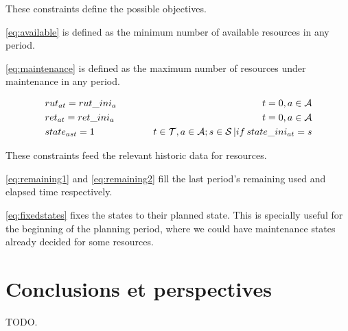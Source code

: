 \documentclass{roadef}
\begin{document}
    These constraints define the possible objectives.

    \ref{eq:available} is defined as the minimum number of available resources in any period.

    \ref{eq:maintenance} is defined as the maximum number of resources under maintenance in any period.

    \begin{align}
        & rut_{at} = rut\_ini_a
                & \hspace{10mm} t = 0, a \in \mathcal{A} \label{eq:remaining1}\\
        & ret_{at} = ret\_ini_a
                & \hspace{10mm} t = 0, a \in \mathcal{A} \label{eq:remaining2}\\
        & state_{ast} = 1
                & \hspace{10mm} t \in \mathcal{T}, a \in \mathcal{A}; s \in \mathcal{S}\, | if\, state\_ini_{at} = s \label{eq:fixedstates}
    \end{align}

    These constraints feed the relevant historic data for resources.

    \ref{eq:remaining1} and \ref{eq:remaining2} fill the last period's remaining used and elapsed time respectively.

    \ref{eq:fixedstates} fixes the states to their planned state. This is specially useful for the beginning of the planning period, where we could have maintenance states already decided for some resources.


\section{Conclusions et perspectives}
    
    TODO.







\end{document}
